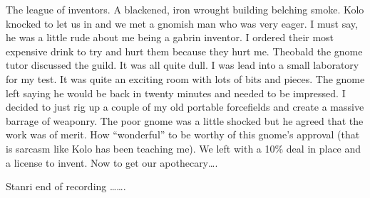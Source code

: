 The league of inventors. A blackened, iron wrought building belching smoke. Kolo knocked to let us in and we met a gnomish man who was very eager. I must say, he was a little rude about me being a gabrin inventor. I ordered their most expensive drink to try and hurt them because they hurt me. Theobald the gnome tutor discussed the guild. It was all quite dull. I was lead into a small laboratory for my test. It was quite an exciting room with lots of bits and pieces. The gnome left saying he would be back in twenty minutes and needed to be impressed. I decided to just rig up a couple of my old portable forcefields and create a massive barrage of weaponry. The poor gnome was a little shocked but he agreed that the work was of merit. How “wonderful” to be worthy of this gnome’s approval (that is sarcasm like Kolo has been teaching me). We left with a 10\% deal in place and a license to invent. Now to get our apothecary….\medskip

Stanri end of recording …….